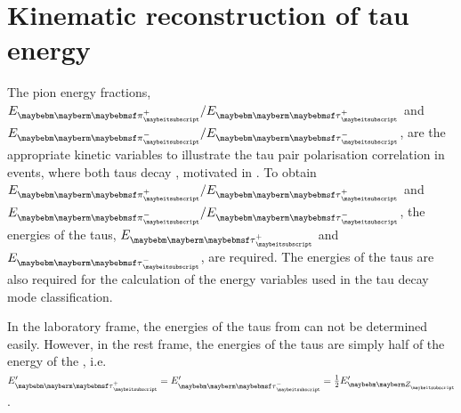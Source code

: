 \section{Kinematic reconstruction of tau energy}

The pion energy fractions, $E_{\Ppiplus} / E_{\APtauon}$ and $E_{\Ppiminus} / E_{\Ptauon}$, are  the appropriate  kinetic variables to illustrate the tau pair polarisation correlation in \eeZZQQ events, where both taus decay \tauToPionBoth, motivated in . To obtain  $E_{\Ppiplus} / E_{\APtauon}$ and $E_{\Ppiminus} / E_{\Ptauon}$, the energies of the taus, $E_{\APtauon}$ and   $E_{\Ptauon}$, are required. The energies of the taus are also required for the calculation of the energy variables used in the tau decay mode classification.



In the laboratory frame, the energies of the taus from  \ZToTauTau can not be determined easily. However, in the \PZ rest frame, the energies of the taus are simply half of the energy of the \PZ, i.e. $E'_{\APtauon} = E'_{\Ptauon} = \frac{1}{2} E'_{\PZ}$.

